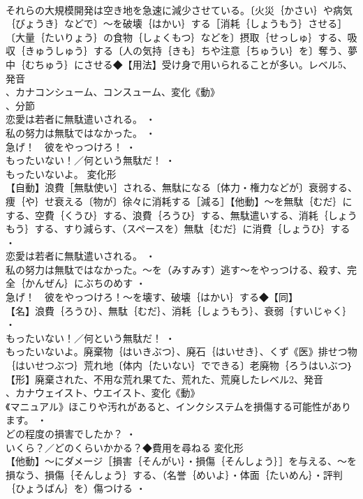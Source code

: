 \documentclass[8pt]{extreport}
\begin{document}
\begin{CJK}{UTF8}{min}
\\	それらの大規模開発は空き地を急速に減少させている。〔火災｛かさい｝や病気｛びょうき｝などで〕～を破壊｛はかい｝する［消耗｛しょうもう｝させる］〔大量｛たいりょう｝の食物｛しょくもつ｝などを〕摂取｛せっしゅ｝する、吸収｛きゅうしゅう｝する〔人の気持｛きも｝ちや注意｛ちゅうい｝を〕奪う、夢中｛むちゅう｝にさせる◆【用法】受け身で用いられることが多い。レベル5、発音
\\	、カナコンシューム、コンスューム、変化《動》
\\	、分節
\\	恋愛は若者に無駄遣いされる。 ・
\\	私の努力は無駄ではなかった。 ・
\\	急げ！　彼をやっつけろ！ ・
\\	もったいない！／何という無駄だ！ ・
\\	もったいないよ。	変化形 
\\	【自動】浪費［無駄使い］される、無駄になる〔体力・権力などが〕衰弱する、痩｛や｝せ衰える〔物が〕徐々に消耗する［減る］【他動】～を無駄｛むだ｝にする、空費｛くうひ｝する、浪費｛ろうひ｝する、無駄遣いする、消耗｛しょうもう｝する、すり減らす、（スペースを）無駄｛むだ｝に消費｛しょうひ｝する ・
\\	恋愛は若者に無駄遣いされる。 ・
\\	私の努力は無駄ではなかった。～を（みすみす）逃す～をやっつける、殺す、完全｛かんぜん｝にぶちのめす ・
\\	急げ！　彼をやっつけろ！～を壊す、破壊｛はかい｝する◆【同】
\\	【名】浪費｛ろうひ｝、無駄｛むだ｝、消耗｛しょうもう｝、衰弱｛すいじゃく｝ ・
\\	もったいない！／何という無駄だ！ ・
\\	もったいないよ。廃棄物｛はいきぶつ｝、廃石｛はいせき｝、くず《医》排せつ物｛はいせつぶつ｝荒れ地〔体内｛たいない｝でできる〕老廃物｛ろうはいぶつ｝【形】廃棄された、不用な荒れ果てた、荒れた、荒廃したレベル2、発音
\\	、カナウェイスト、ウエイスト、変化《動》
\\	《マニュアル》ほこりや汚れがあると、インクシステムを損傷する可能性があります。 ・
\\	どの程度の損害でしたか？ ・
\\	いくら？／どのくらいかかる？◆費用を尋ねる	変化形 
\\	【他動】～にダメージ［損害｛そんがい｝・損傷｛そんしょう｝］を与える、～を損なう、損傷｛そんしょう｝する、（名誉｛めいよ｝・体面｛たいめん｝・評判｛ひょうばん｝を）傷つける ・

\end{CJK}
\end{document}
